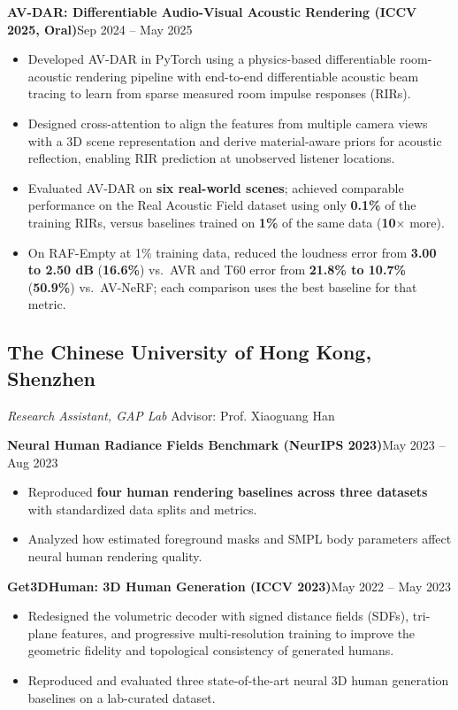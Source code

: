 \documentclass[11pt]{article}
\newcommand{\project}[2]{%
  \par\addvspace{7pt}\noindent\textbf{#1}\hfill{\small #2}\par\nopagebreak}
\newcommand{\oneitem}[1]{\item #1}
\newcommand{\twoitem}[2]{\item #1 #2}
\begin{document}
\project{AV-DAR: Differentiable Audio-Visual Acoustic Rendering (ICCV 2025, Oral)}{Sep 2024 -- May 2025}
\begin{itemize}
\twoitem{Developed AV-DAR in PyTorch using a physics-based differentiable room-acoustic rendering pipeline with}
  {end-to-end differentiable acoustic beam tracing to learn from sparse measured room impulse responses (RIRs).}
\twoitem{Designed cross-attention to align the features from multiple camera views with a 3D scene representation and}
  {derive material-aware priors for acoustic reflection, enabling RIR prediction at unobserved listener locations.}
\twoitem{Evaluated AV-DAR on \textbf{six real-world scenes}; achieved comparable performance on the Real Acoustic Field}
  {dataset using only \textbf{0.1\%} of the training RIRs, versus baselines trained on \textbf{1\%} of the same data (\textbf{10$\times$} more).}
\twoitem{On RAF-Empty at 1\% training data, reduced the loudness error from \textbf{3.00 to 2.50 dB} (\textbf{16.6\%}) vs.\ AVR and}
  {T60 error from \textbf{21.8\% to 10.7\%} (\textbf{50.9\%}) vs.\ AV-NeRF; each comparison uses the best baseline for that metric.}
\end{itemize}

\subsection{\textbf{The Chinese University of Hong Kong, Shenzhen}}
\textit{Research Assistant, GAP Lab} \hfill Advisor: Prof. Xiaoguang Han

\project{Neural Human Radiance Fields Benchmark (NeurIPS 2023)}{May 2023 -- Aug 2023}
\begin{itemize}
\oneitem{Reproduced \textbf{four human rendering baselines across three datasets} with standardized data splits and metrics.}
\oneitem{Analyzed how estimated foreground masks and SMPL body parameters affect neural human rendering quality.}
\end{itemize}

\project{Get3DHuman: 3D Human Generation (ICCV 2023)}{May 2022 -- May 2023}
\begin{itemize}
\twoitem{Redesigned the volumetric decoder with signed distance fields (SDFs), tri-plane features, and progressive}
  {multi-resolution training to improve the geometric fidelity and topological consistency of generated humans.}
\oneitem{Reproduced and evaluated three state-of-the-art neural 3D human generation baselines on a lab-curated dataset.}
\end{itemize}
\end{document}
